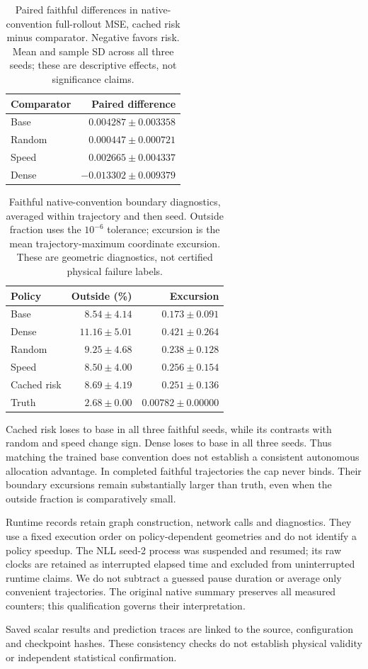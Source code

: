 \begin{table}[t]
\caption{Paired faithful differences in native-convention full-rollout MSE, cached risk minus comparator. Negative favors risk. Mean and sample SD across all three seeds; these are descriptive effects, not significance claims.}
\label{tab:native-rollout-paired}
\centering\small
\begin{tabular}{lr}
\toprule Comparator&Paired difference\\\midrule
Base&$0.004287\pm0.003358$\\
Random&$0.000447\pm0.000721$\\
Speed&$0.002665\pm0.004337$\\
Dense&$-0.013302\pm0.009379$\\
\bottomrule
\end{tabular}
\end{table}

\begin{table}[t]
\caption{Faithful native-convention boundary diagnostics, averaged within trajectory and then seed. Outside fraction uses the $10^{-6}$ tolerance; excursion is the mean trajectory-maximum coordinate excursion. These are geometric diagnostics, not certified physical failure labels.}
\label{tab:native-rollout-boundaries}
\centering\small
\begin{tabular}{lrr}
\toprule Policy&Outside (\%)&Excursion\\\midrule
Base&$8.54\pm4.14$&$0.173\pm0.091$\\
Dense&$11.16\pm5.01$&$0.421\pm0.264$\\
Random&$9.25\pm4.68$&$0.238\pm0.128$\\
Speed&$8.50\pm4.00$&$0.256\pm0.154$\\
Cached risk&$8.69\pm4.19$&$0.251\pm0.136$\\
Truth&$2.68\pm0.00$&$0.00782\pm0.00000$\\
\bottomrule
\end{tabular}
\end{table}

Cached risk loses to base in all three faithful seeds, while its contrasts with random and speed change sign. Dense loses to base in all three seeds. Thus matching the trained base convention does not establish a consistent autonomous allocation advantage. In completed faithful trajectories the cap never binds. Their boundary excursions remain substantially larger than truth, even when the outside fraction is comparatively small.

Runtime records retain graph construction, network calls and diagnostics. They use a fixed execution order on policy-dependent geometries and do not identify a policy speedup. The NLL seed-2 process was suspended and resumed; its raw clocks are retained as interrupted elapsed time and excluded from uninterrupted runtime claims. We do not subtract a guessed pause duration or average only convenient trajectories. The original native summary preserves all measured counters; this qualification governs their interpretation.

Saved scalar results and prediction traces are linked to the source, configuration and checkpoint hashes. These consistency checks do not establish physical validity or independent statistical confirmation.
